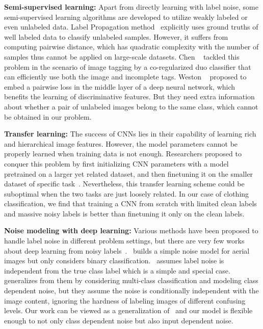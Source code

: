 \documentclass[10pt,twocolumn,letterpaper]{article}
\begin{document}
{\bf Semi-supervised learning:} Apart from directly learning with label noise, some semi-supervised learning algorithms are developed to utilize weakly labeled or even unlabeled data. Label Propagation method~\cite{zhu2002learning} explicitly uses ground truths of well labeled data to classify unlabeled samples. However, it suffers from computing pairwise distance, which has quadratic complexity with the number of samples thus cannot be applied on large-scale datasets. Chen \etal~\cite{chen2013fast} tackled this problem in the scenario of image tagging by a co-regularized duo classifier that can efficiently use both the image and incomplete tags. Weston \etal~\cite{weston2012deep} proposed to embed a pairwise loss in the middle layer of a deep neural network, which benefits the learning of discriminative features. But they need extra information about whether a pair of unlabeled images belong to the same class, which cannot be obtained in our problem.

{\bf Transfer learning:} The success of CNNs lies in their capability of learning rich and hierarchical image features. However, the model parameters cannot be properly learned when training data is not enough. Researchers proposed to conquer this problem by first initializing CNN parameters with a model pretrained on a larger yet related dataset, and then finetuning it on the smaller dataset of specific task~\cite{krizhevsky2012imagenet, oquab2013learning, azizpour2014generic,donahue2013decaf}. Nevertheless, this transfer learning scheme could be suboptimal when the two tasks are just loosely related. In our case of clothing classification, we find that training a CNN from scratch with limited clean labels and massive noisy labels is better than finetuning it only on the clean labels.

{\bf Noise modeling with deep learning:} Various methods have been proposed to handle label noise in different problem settings, but there are very few works about deep learning from noisy labels~\cite{mnih2012learning, larsen1998design, sukhbaatar2014learning}.~\cite{mnih2012learning} builds a simple noise model for aerial images but only considers binary classification.~\cite{larsen1998design} assumes label noise is independent from the true class label which is a simple and special case.~\cite{sukhbaatar2014learning} generalizes from them by considering multi-class classification and modeling class dependent noise, but they assume the noise is conditionally independent with the image content, ignoring the hardness of labeling images of different confusing levels. Our work can be viewed as a generalization of~\cite{sukhbaatar2014learning,natarajan2013learning} and our model is flexible enough to not only class dependent noise but also input dependent noise.
\end{document}
